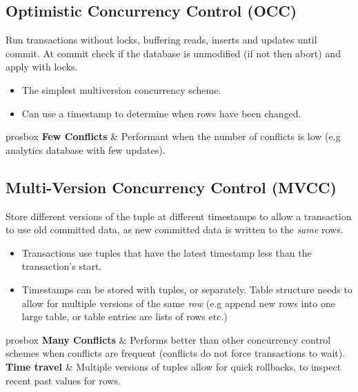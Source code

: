 \subsection{Optimistic Concurrency Control (OCC)}
Run transactions without locks, buffering reads, inserts and updates until commit. At commit check if the database is unmodified (if not then abort) and apply with locks.
\begin{itemize}
    \item The simplest multiversion concurrency scheme.
    \item Can use a timestamp to determine when rows have been changed.
\end{itemize}

\begin{tabbox}{prosbox}
    \textbf{Few Conflicts} & Performant when the number of conflicts is low (e.g analytics database with few updates). \\
\end{tabbox}

\subsection{Multi-Version Concurrency Control (MVCC)}
Store different versions of the tuple at different timestamps to allow a transaction to use old committed data, as new committed data is written to the \textit{same} rows.
\begin{itemize}
    \item Transactions use tuples that have the latest timestamp less than the transaction's start.
    \item Timestamps can be stored with tuples, or separately. Table structure needs to allow for multiple versions of the same \textit{row} (e.g append new rows into one large table, or table entries are lists of rows etc.)
\end{itemize}

\begin{tabbox}{prosbox}
    \textbf{Many Conflicts} & Performs better than other concurrency control schemes when conflicts are frequent (conflicts do not force transactions to wait). \\
    \textbf{Time travel} & Multiple versions of tuples allow for quick rollbacks, to inspect recent past values for rows. \\
\end{tabbox}
